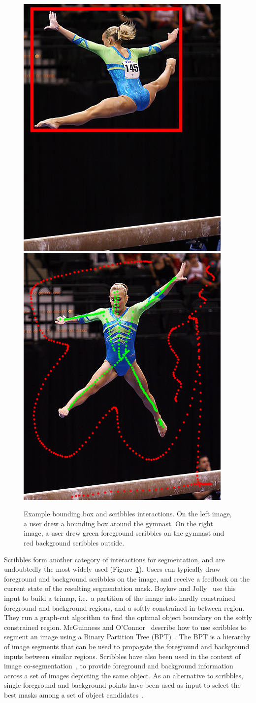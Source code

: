 \begin{figure}[ht]
\centering
\includegraphics[width=0.45\columnwidth]{assets/img/gymnast_rect.jpg}
\hfill
\includegraphics[width=0.45\columnwidth]{assets/img/gymnast_scrib.jpg}
\caption{Example bounding box and scribbles interactions.
On the left image, a user drew a bounding box around the gymnast.
On the right image, a user drew green foreground scribbles
on the gymnast and red background scribbles outside.}%
\label{fig:rect_scrib}
\end{figure}


Scribbles form another category of interactions for segmentation,
and are undoubtedly the most widely used
(Figure~\ref{fig:rect_scrib}).
Users can typically draw foreground and background scribbles
on the image, and receive a feedback on the current state
of the resulting segmentation mask.
Boykov and Jolly~\cite{boykov_interactive_2001} use this input to build a trimap,
i.e.\ a partition of the image into hardly constrained foreground
and background regions, and a softly constrained in-between region.
They run a graph-cut algorithm to find the optimal object boundary
on the softly constrained region.
McGuinness and O’Connor~\cite{mcguinness2010comparative} describe
how to use scribbles to segment an image using
a Binary Partition Tree (BPT)~\cite{salembier2000binary}.
The BPT is a hierarchy of image segments that can be used to propagate
the foreground and background inputs between similar regions.
Scribbles have also been used in the context of
image co-segmentation~\cite{batra_icoseg:_2010},
to provide foreground and background information across
a set of images depicting the same object.
As an alternative to scribbles, single foreground and background points
have been used as input to select the best masks
among a set of object candidates~\cite{carlier_clickncut:_2014}.


